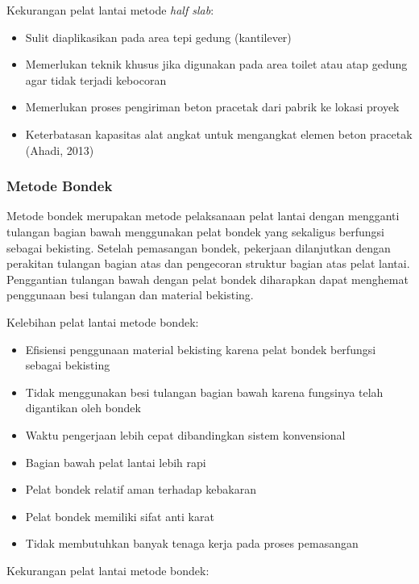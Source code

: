 \documentclass[../modul_skb.tex]{subfiles}
\begin{document}
Kekurangan pelat lantai metode \textit{half slab}:

\begin{itemize}
	\item Sulit diaplikasikan pada area tepi gedung (kantilever)
	\item Memerlukan teknik khusus jika digunakan pada area toilet atau atap gedung agar tidak terjadi kebocoran
	\item Memerlukan proses pengiriman beton pracetak dari pabrik ke lokasi proyek
	\item Keterbatasan kapasitas alat angkat untuk mengangkat elemen beton pracetak (Ahadi, 2013)
\end{itemize}

\subsubsection{Metode Bondek}

Metode bondek merupakan metode pelaksanaan pelat lantai dengan mengganti tulangan bagian bawah menggunakan pelat bondek yang sekaligus berfungsi sebagai bekisting. Setelah pemasangan bondek, pekerjaan dilanjutkan dengan perakitan tulangan bagian atas dan pengecoran struktur bagian atas pelat lantai. Penggantian tulangan bawah dengan pelat bondek diharapkan dapat menghemat penggunaan besi tulangan dan material bekisting.

Kelebihan pelat lantai metode bondek:

\begin{itemize}
	\item Efisiensi penggunaan material bekisting karena pelat bondek berfungsi sebagai bekisting
	\item Tidak menggunakan besi tulangan bagian bawah karena fungsinya telah digantikan oleh bondek
	\item Waktu pengerjaan lebih cepat dibandingkan sistem konvensional
	\item Bagian bawah pelat lantai lebih rapi
	\item Pelat bondek relatif aman terhadap kebakaran
	\item Pelat bondek memiliki sifat anti karat
	\item Tidak membutuhkan banyak tenaga kerja pada proses pemasangan
\end{itemize}

Kekurangan pelat lantai metode bondek:
\end{document}
